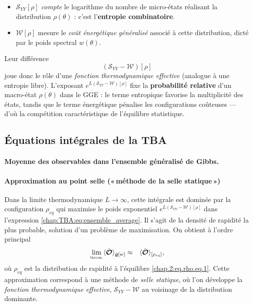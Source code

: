 \begin{itemize}[label = $\bullet$] 
\item $\mathcal{S}_{YY}[\rho]$ \emph{compte} le logarithme du nombre de
      micro-états réalisant la distribution $\rho(\theta)$ :
      c’est l’\textbf{entropie combinatoire}.
\item $\mathcal{W}[\rho]$ mesure le \emph{coût énergétique généralisé}
      associé à cette distribution, dicté par le poids spectral $w(\theta)$.
\end{itemize}

Leur différence
\[
(\mathcal{S}_{YY}-\mathcal{W})[\rho]
\]
joue donc le rôle d’une \emph{fonction thermodynamique effective}
(analogue à une entropie libre).  
L’exposant $e^{L(\mathcal{S}_{YY}-\mathcal{W})[\rho]}$ fixe la \textbf{probabilité relative} d’un
macro-état $\rho(\theta)$ dans le GGE : le terme entropique favorise la
multiplicité des états, tandis que le terme énergétique pénalise les
configurations coûteuses — d’où la compétition caractéristique de
l’équilibre statistique.






%
\subsection{Équations intégrales de la TBA}

\paragraph{Moyenne des observables dans l’ensemble généralisé de Gibbs.}

\paragraph{Approximation au point selle («\,méthode de la selle statique\,»)}

Dans la limite thermodynamique \( L \to \infty \), cette intégrale est dominée par la configuration \( \rho_{eq} \) qui maximise le poids exponentiel $e^{L(\mathcal{S}_{YY}-\mathcal{W})[\rho]}$  dans l'expression \eqref{chap:TBA:eq:ensemble_average}. Il s’agit de la densité de rapidité la plus probable, solution d’un problème de maximisation. On obtient à l’ordre principal
\begin{eqnarray}
	\underset{\mbox{\tiny therm.}}{\lim} \langle \hat{\bm{\mathcal{O}}} \rangle_{\hat{\bm{\varrho}}[w]} & \approx &  \langle\hat{\bm{\mathcal{O}}}\rangle_{[\rho_{eq} ]},	
	\label{chap:TBA:eq:ensemble_average:approx}
\end{eqnarray}
où $\rho_{eq}$ est la distribution de rapidité à l'équilibre \eqref{chap.2:eq.rho.eq.1}.
Cette approximation correspond à une méthode de \textit{selle statique}, où l’on développe la \emph{fonction thermodynamique effective}, $\mathcal{S}_{YY}-\mathcal{W}$  au voisinage de la distribution dominante.


